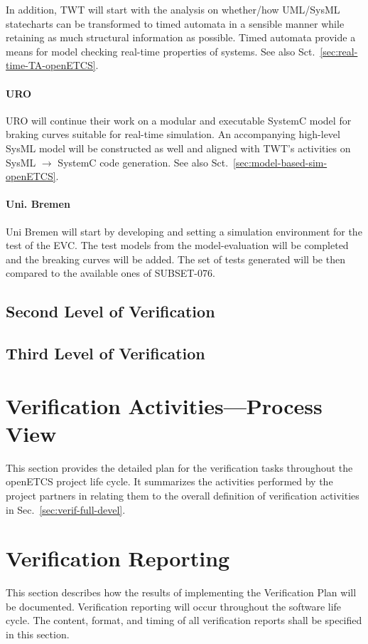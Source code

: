 In addition, TWT will start with the analysis on whether/how UML/SysML
statecharts can be transformed to timed automata in a sensible manner
while retaining as much structural information as possible. Timed
automata provide a means for model checking real-time properties of
systems. See also Sct.~\ref{sec:real-time-TA-openETCS}.

\paragraph{URO}
URO will continue their work on a modular and executable SystemC model
for braking curves suitable for real-time simulation. An accompanying
high-level SysML model will be constructed as well and aligned with
TWT's activities on SysML $\rightarrow$ SystemC code generation.  See
also Sct.~\ref{sec:model-based-sim-openETCS}.

\paragraph{Uni. Bremen}
Uni Bremen will start by developing and setting a simulation
environment for the test of the EVC. The test models from the
model-evaluation will be completed and the breaking curves will be
added.  The set of tests generated will be then compared to the
available ones of SUBSET-076.


\subsection{Second Level of Verification}
\label{sec:secon-level-verif}

\subsection{Third Level of Verification}
\label{sec:third-level-verif}


\section{Verification Activities---Process View}
\label{sec:verif-activ-proce}
This section provides the detailed plan for the verification tasks
throughout the openETCS project life cycle. It summarizes the
activities performed by the project partners in relating them to the
overall definition of verification activities in
Sec.~\ref{sec:verif-full-devel}. 

\section{Verification Reporting}
This section describes how the results of implementing the
Verification Plan will be documented.  Verification reporting will
occur throughout the software life cycle.  The content, format, and
timing of all verification reports shall be specified in this section.

